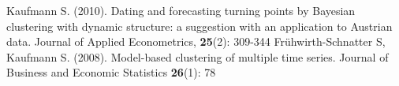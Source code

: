 \documentclass[10pt,french,french]{article}
\begin{document}
\newpage

\nocite{*}

\begin{thebibliography}{999}
 Kaufmann S. (2010). Dating and forecasting turning points by Bayesian clustering with dynamic structure: a suggestion with an application to Austrian data. Journal of Applied Econometrics, \textbf{25}(2): 309-344 
 Frühwirth-Schnatter S, Kaufmann S. (2008). Model-based clustering of multiple time series. Journal of Business and Economic Statistics \textbf{26}(1): 78
\end{thebibliography}
\end{document}
